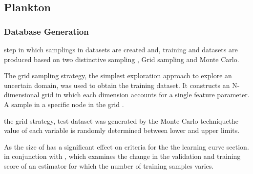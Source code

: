 \subsection{Plankton}

\subsubsection{Database Generation}

    \DIFdelbegin {}\DIFdelend \DIFaddbegin {}\DIFaddend step in which samplings in datasets are created and, training and \DIFdelbegin {}\DIFdelend \DIFaddbegin {}\DIFaddend datasets are produced based on two distinctive sampling \DIFdelbegin {}\DIFdelend \DIFaddbegin {}\DIFaddend , Grid sampling and Monte Carlo.

    The grid sampling strategy, the simplest exploration approach to explore an uncertain domain, was used to obtain the training dataset. It constructs an N-dimensional grid in which each dimension accounts for a single feature parameter. \DIFaddbegin {}\DIFaddend A sample in \DIFdelbegin {}\DIFdelend \DIFaddbegin {}\DIFaddend a specific node in the grid \DIFaddbegin {}\DIFaddend .

    \DIFdelbegin {}\DIFdelend \DIFaddbegin {}\DIFaddend the grid strategy, \DIFdelbegin {}\DIFdelend \DIFaddbegin {}\DIFaddend test dataset was generated by the Monte Carlo technique\DIFdelbegin {}\DIFdelend \DIFaddbegin {}\DIFaddend the value of each variable is randomly determined between \DIFdelbegin {}\DIFdelend \DIFaddbegin {}\DIFaddend lower and upper limits.
\DIFaddbegin 

    \DIFaddend As the size of \DIFdelbegin {}\DIFdelend \DIFaddbegin {}\DIFaddend has a significant effect on \DIFdelbegin {}\DIFdelend \DIFaddbegin {}\DIFaddend criteria for the \DIFdelbegin {}\DIFdelend \DIFaddbegin {}\DIFaddend the learning curve section. \DIFdelbegin {}\DIFdelend \DIFaddbegin {}\DIFaddend in conjunction with \DIFdelbegin {}\DIFdelend \DIFaddbegin {}\DIFaddend , which examines the change in the validation and training score of an estimator for which the number of training samples varies.

